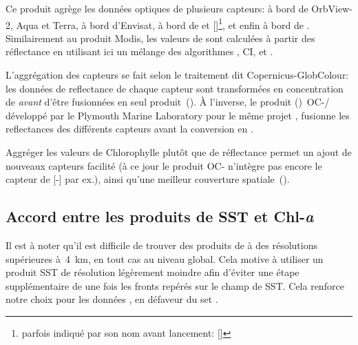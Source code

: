 Ce produit agrège les données optiques de plusieurs capteurs:  à bord de OrbView-2,  Aqua et Terra,  à bord d'Envisat,  à bord de  et []\footnote{parfois indiqué par son nom avant lancement: []}, et enfin  à bord de .
Similairement au produit Modis, les valeurs de  sont calculées à partir des réflectance en utilisant ici un mélange des algorithmes , CI, et .

\begin{note}[label={note:merge-chl-or-rrs}]
  L'aggrégation des capteurs se fait selon le traitement dit Copernicus-GlobColour: les données de reflectance de chaque capteur sont transformées en concentration de  \emph{avant} d'être fusionnées en seul produit~(\cite{garnesson_2019}).
  À l'inverse, le produit ()~OC-/ développé par le Plymouth Marine Laboratory pour le même projet , fusionne les reflectances des différents capteurs avant la conversion en .

  Aggréger les valeurs de Chlorophylle plutôt que de réflectance permet  un ajout de nouveaux capteurs facilité (à ce jour le produit OC- n'intègre pas encore le capteur de [-] par ex.), ainsi qu'une meilleur couverture spatiale~(\cite{garnesson_2019}).
\end{note}

\begin{figure}
  \centering
  \label{fig:comparaison-chl}
\end{figure}

\subsection{Accord entre les produits de SST et Chl-\textit{a}}

Il est à noter qu'il est difficile de trouver des produits de  à des résolutions supérieures à~\qty{4}{\km}, en tout cas au niveau global.
Cela motive à utiliser un produit SST de résolution légèrement moindre afin d'éviter une étape supplémentaire de  une fois les fronts repérés sur le champ de SST.
Cela renforce notre choix pour les données , en défaveur du set .

